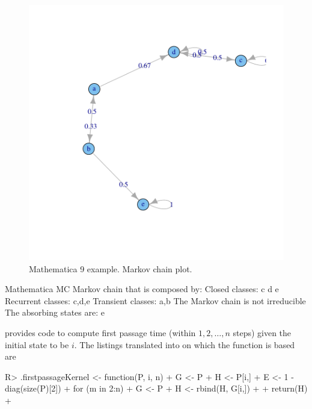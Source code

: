 \documentclass[nojss]{jss}
\begin{document}
\begin{figure}
\begin{center}
\includegraphics{an_introduction_to_markovchain_package-mathematica9McFig}
\caption{Mathematica 9 example. Markov chain plot.}
\label{fig:mcMathematics}
\end{center}
\end{figure}

\begin{Schunk}
\begin{Soutput}
Mathematica MC  Markov chain that is composed by: 
Closed classes: 
c d 
e 
Recurrent classes: 
{c,d},{e}
Transient classes: 
{a,b}
The Markov chain is not irreducible 
The absorbing states are: e
\end{Soutput}
\end{Schunk}



\cite{renaldoMatlab} provides code to compute first passage time (within $1,2,\ldots, n$ steps) given the initial state to be $i$. The  listings translated into  on which the  function is based are

\begin{Schunk}
\begin{Sinput}
R> .firstpassageKernel <- function(P, i, n){
+    G <- P
+    H <- P[i,]
+    E <- 1 - diag(size(P)[2])
+    for (m in 2:n) {
+      G <- P %
+      H <- rbind(H, G[i,])
+    }
+    return(H)
+  }
\end{Sinput}
\end{Schunk}
\end{document}
